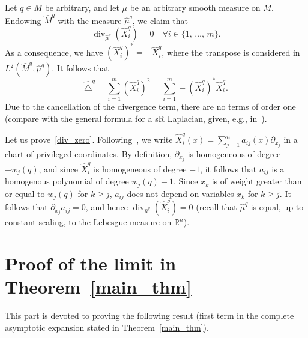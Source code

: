 \documentclass[AHL,Unicode,published]{cedram}
\newcommand*\R{\mathbb{R}}
\DeclareMathOperator{\divl}{div}
\renewcommand{\geq}{\geqslant}
\let\oldforall\forall
\renewcommand*{\forall}{\mathrel{\oldforall}}
\begin{document}
\begin{rema}\label{rem_nilpLap}
Let $q\in M$ be arbitrary, and let $\mu$ be an arbitrary smooth measure on $M$. Endowing $\widehat{M}^{q}$ with the measure $\widehat{\mu}^{q}$, we claim that
\begin{equation}\label{div_zero}
\divl_{\widehat{\mu}^{q}}\left(\widehat{X}^{q}_i\right)=0 \quad \forall i\in\{1,\,\ldots,\,m\}.
\end{equation}
As a consequence, we have $(\widehat{X}^{q}_i)^*=-\widehat{X}^{q}_i$, where the transpose is considered in $L^2(\widehat{M}^{q},\widehat{\mu}^{q})$. It follows that
\[
\widehat{\triangle}^{q} = \sum_{i=1}^m \left(\widehat{X}^{q}_i\right)^2 = \sum_{i=1}^m - \left(\widehat{X}^{q}_i\right)^*\widehat{X}^{q}_i.
\]
Due to the cancellation of the divergence term, there are no terms of order one (compare with the general formula for a sR Laplacian, given, e.g., in~\cite{CHT-SEDP}).

Let us prove~\eqref{div_zero}. Following~\cite[page 25]{Jean_2014}, we write $\widehat{X}^{q}_i(x) = \sum_{j=1}^n a_{ij}(x)\partial_{x_j}$ in a chart of privileged coordinates. By definition, $\partial_{x_j}$ is homogeneous of degree $-w_j(q)$, and since $\widehat{X}^{q}_i$ is homogeneous of degree $-1$, it follows that $a_{ij}$ is a homogenous polynomial of degree $w_j(q)-1$. Since $x_k$ is of weight greater than or equal to $w_j(q)$ for $k\geq j$, $a_{ij}$ does not depend on variables $x_k$ for $k\geq j$. It follows that $\partial_{x_j}a_{ij}=0$, and hence $\divl_{\widehat{\mu}^{q}}(\widehat{X}^{q}_i)=0$ (recall that $\widehat{\mu}^{q}$ is equal, up to constant scaling, to the Lebesgue measure on $\R^n$).
\end{rema}

\goodbreak
{\Large
\part{Proof of the limit in Theorem~\ref{main_thm}}\label{part_limit}
}


This part is devoted to proving the following result (first term in the complete asymptotic expansion stated in Theorem~\ref{main_thm}).
\end{document}
